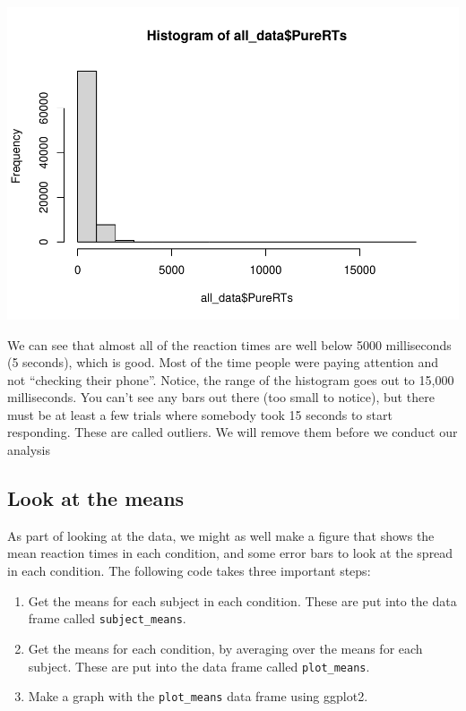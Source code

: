 \documentclass[
]{book}
\providecommand{\tightlist}{%
  \setlength{\itemsep}{0pt}\setlength{\parskip}{0pt}}
\begin{document}
\includegraphics{Statistics_Lab_files/figure-latex/unnamed-chunk-493-1.pdf}

We can see that almost all of the reaction times are well below 5000 milliseconds (5 seconds), which is good. Most of the time people were paying attention and not ``checking their phone''. Notice, the range of the histogram goes out to 15,000 milliseconds. You can't see any bars out there (too small to notice), but there must be at least a few trials where somebody took 15 seconds to start responding. These are called outliers. We will remove them before we conduct our analysis

\hypertarget{look-at-the-means}{%
\subsection{Look at the means}\label{look-at-the-means}}

As part of looking at the data, we might as well make a figure that shows the mean reaction times in each condition, and some error bars to look at the spread in each condition. The following code takes three important steps:

\begin{enumerate}
\def\labelenumi{\arabic{enumi}.}
\tightlist
\item
  Get the means for each subject in each condition. These are put into the data frame called \texttt{subject\_means}.
\item
  Get the means for each condition, by averaging over the means for each subject. These are put into the data frame called \texttt{plot\_means}.
\item
  Make a graph with the \texttt{plot\_means} data frame using ggplot2.
\end{enumerate}
\end{document}
